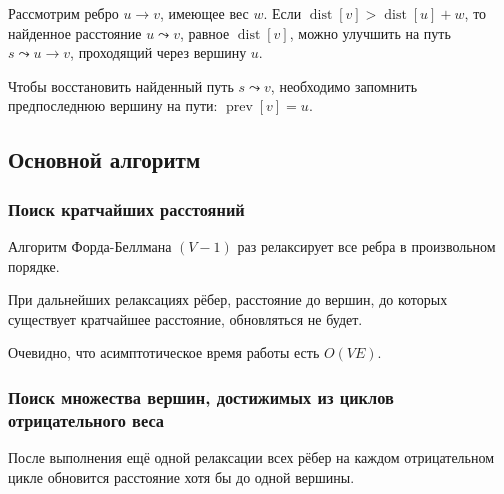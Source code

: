 \documentclass[a4paper,12pt]{article}
\DeclareMathOperator{\dist}{dist}
\DeclareMathOperator{\prev}{prev}
\begin{document}
    Рассмотрим ребро $u \to v$, имеющее вес $w$.
    Если $\dist[v] > \dist[u] + w$, то найденное расстояние $u \leadsto v$,
    равное $\dist[v]$, можно улучшить на путь $s \leadsto u \to v$,
    проходящий через вершину $u$.
    
    Чтобы восстановить найденный путь $s \leadsto v$, необходимо запомнить
    предпоследнюю вершину на пути: $\prev[v] = u$.

    \begin{minipage}{0.5\linewidth}
    
    \end{minipage}
    \begin{minipage}{0.4\linewidth}
    \end{minipage}

    \subsection{Основной алгоритм}
      \subsubsection{Поиск кратчайших расстояний}
      Алгоритм Форда-Беллмана $(V - 1)$ раз релаксирует
      все ребра в произвольном порядке.
      
      
      При дальнейших релаксациях рёбер, расстояние до вершин,
      до которых существует кратчайшее расстояние, обновляться не будет.

      Очевидно, что асимптотическое время работы есть $O(VE)$.
    
      \subsubsection{Поиск множества вершин, достижимых из циклов отрицательного веса}
      После выполнения ещё одной релаксации всех рёбер
      на каждом отрицательном цикле обновится расстояние хотя бы до одной вершины.
    
\end{document}
